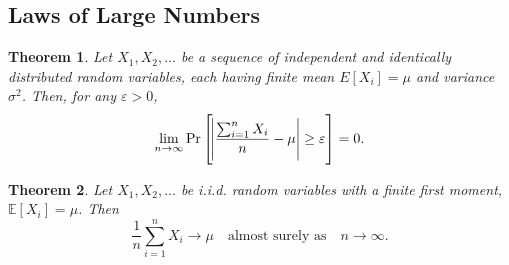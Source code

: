 \documentclass[12pt,openany]{book}
\newtheorem{theorem}{Theorem}[chapter]
\theoremstyle{definition}
\begin{document}
	\subsection{Laws of Large Numbers}
	
	\begin{tcolorbox}[colback=white,colframe=thmcolor,arc=5pt,title={\color{white}\bf Weak Law of Large Numbers}]
		\begin{theorem}
			Let $X_1,X_2,\dots$ be a sequence of independent and identically distributed random variables, each having finite mean $E[X_i]=\mu$ and variance $\sigma^2$. Then, for any $\varepsilon>0$, \[
			\lim\limits_{n\to\infty}\Pr\sbr{\abs{\frac{\sum_{i=1}^n X_i}{n}-\mu}\geq\varepsilon}=0.
			\]
		\end{theorem}
	\end{tcolorbox}
	\vspace{20pt}
	\begin{tcolorbox}[colback=white,colframe=thmcolor,arc=5pt,title={\color{white}\bf Strong Law of Large Numbers}]
		\begin{theorem}
			Let $X_1,X_2,\dots$ be i.i.d. random variables with a finite first moment, $\mathbb{E}[X_i]=\mu$. Then \[
			\frac{1}{n}\sum_{i=1}^nX_i\to\mu\quad\text{almost surely as}\quad n\to\infty.
			\]
		\end{theorem}
	\end{tcolorbox}
	
	\newpage
\end{document}
